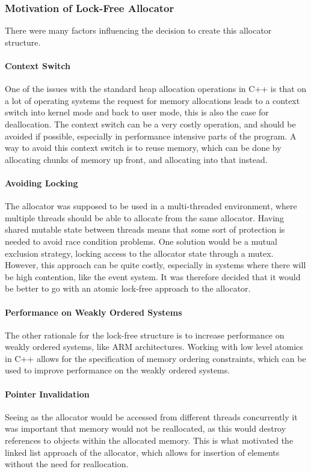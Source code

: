 \subsubsection{Motivation of Lock-Free Allocator}
There were many factors influencing the decision to create this allocator structure.

\paragraph{Context Switch}
One of the issues with the standard heap allocation operations in C++ is that
on a lot of operating systems the request for memory allocations leads to a context switch into
kernel mode and back to user mode, this is also the case for deallocation.
The context switch can be a very costly operation, and should be avoided
if possible, especially in performance intensive parts of the program\cite[p. 240]{game_engine_architecture}.
A way to avoid this context switch is to reuse memory, which can be done by allocating
chunks of memory up front, and allocating into that instead.

\paragraph{Avoiding Locking}
The allocator was supposed to be used in a multi-threaded environment, where multiple threads
should be able to allocate from the same allocator.
Having shared mutable state between threads means that some sort of protection is needed
to avoid race condition problems.
One solution would be a mutual exclusion strategy, locking access to the allocator state through a mutex.
However, this approach can be quite costly, especially in systems where there will be high contention,
like the event system.
It was therefore decided that it would be better to go with an atomic lock-free approach to the allocator.

\paragraph{Performance on Weakly Ordered Systems}
The other rationale for the lock-free structure is to increase performance on weakly ordered systems,
like ARM architectures\cite{preshing_weak_vs_strong_memory_models}.
Working with low level atomics in C++ allows for the specification of memory ordering constraints,
which can be used to improve performance on the weakly ordered systems.

\paragraph{Pointer Invalidation}
Seeing as the allocator would be accessed from different threads concurrently it was important that
memory would not be reallocated, as this would destroy references to objects within the allocated memory.
This is what motivated the linked list approach of the allocator, which allows for insertion of elements without
the need for reallocation.

